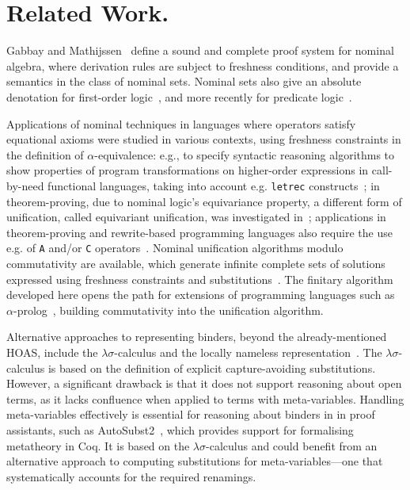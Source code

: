 \section{Related Work.}
Gabbay and Mathijssen~\cite{DBLP:journals/logcom/GabbayM09} define a sound and complete proof system for nominal algebra, where derivation rules are subject to freshness conditions,
and provide a semantics in the class of nominal sets. %
Nominal sets also give an absolute denotation for first-order logic~\cite{DBLP:journals/jacm/Gabbay16}, and more recently for predicate logic~\cite{dowek2023nominalsemanticspredicatelogic}.

 Applications of nominal techniques in languages where operators satisfy equational axioms were studied in various contexts, using freshness constraints in the definition of $\alpha$-equivalence: e.g., to specify syntactic reasoning algorithms to  show properties of program transformations on higher-order expressions in call-by-need functional languages, taking into account e.g. {\tt letrec} constructs~\cite{DBLP:journals/fuin/Schmidt-Schauss22};  in theorem-proving, due to nominal logic’s equivariance property,  a different form of unification,  called equivariant unification, was investigated in~\cite{DBLP:journals/jar/Cheney10};
 applications in theorem-proving and rewrite-based programming languages also require the use e.g. of {\tt A} and/or {\tt C} operators~\cite{AYALARINCON20193}.  Nominal unification algorithms modulo commutativity are available, which generate infinite complete sets of solutions expressed using freshness constraints and substitutions~\cite{DBLP:conf/frocos/Ayala-RinconSFN17,   DBLP:journals/mscs/Ayala-RinconSFS21}. 
The finitary  algorithm  developed here opens the path for  extensions of programming languages such as  $\alpha$-prolog~\cite{DBLP:conf/iclp/CheneyU04}, building commutativity into the unification algorithm. 


Alternative approaches to representing binders, beyond the already-mentioned HOAS, include the $\lambda\sigma$-calculus\cite{DBLP:journals/jfp/AbadiCCL91} and the locally nameless  representation~\cite{DBLP:journals/jar/Chargueraud12}. The $\lambda\sigma$-calculus is based on the definition of  explicit capture-avoiding substitutions. However, a significant drawback is that it does not support reasoning about open terms, as it lacks confluence when applied to terms with meta-variables.
Handling meta-variables effectively is essential for reasoning about binders in  in proof assistants, such as AutoSubst2~\cite{DBLP:conf/cpp/StarkSK19}, which provides support for formalising metatheory in Coq. It is based on the  $\lambda\sigma$-calculus and could benefit from an alternative approach to computing substitutions for meta-variables—one that systematically accounts for the required renamings.


